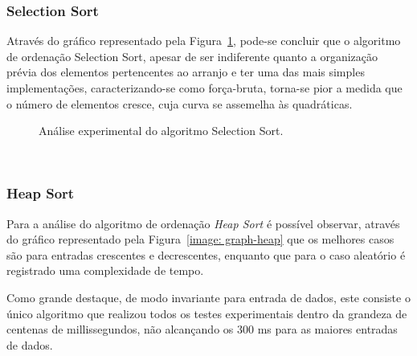 \documentclass[conference,onecolumn]{IEEEtran}
\begin{document}
\subsubsection{Selection Sort}

Através do gráfico representado pela Figura~\ref{image: graph-selection}, pode-se concluir que o algoritmo de ordenação Selection Sort, apesar de ser indiferente quanto a organização prévia dos elementos pertencentes ao arranjo e ter uma das mais simples implementações, caracterizando-se como força-bruta, torna-se pior a medida que o número de elementos cresce, cuja curva se assemelha às quadráticas.

\begin{figure}[H]


\centering
{}
\caption{Análise experimental do algoritmo Selection Sort.}
\label{image: graph-selection}
\end{figure}



~\\
\subsubsection{Heap Sort}

Para a análise do algoritmo de ordenação \textit{Heap Sort} é possível observar, através do gráfico representado pela Figura~\ref{image: graph-heap} que os melhores casos são para entradas crescentes e decrescentes, enquanto que para o caso aleatório é registrado uma complexidade de tempo. 

Como grande destaque, de modo invariante para entrada de dados, este consiste o único algoritmo que realizou todos os testes experimentais dentro da grandeza de centenas de millissegundos, não alcançando os 300 ms para as maiores entradas de dados.
\end{document}
